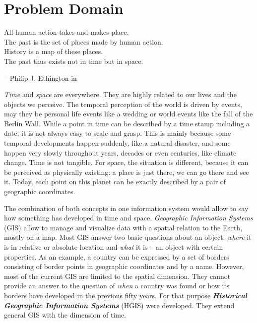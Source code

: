 
\newpage
\section{Problem Domain} %
\label{sec:problem_domain}

\begin{quoteit}
  All human action takes and makes place. \\
  The past is the set of places made by human action. \\
  History is a map of these places. \\
  The past thus exists not in time but in space.
\end{quoteit}
\hfill -- Philip J. Ethington in \cite[précis]{citeTakeMakePlace}

\emph{Time} and \emph{space} are everywhere. They are highly related to our lives and the objects we perceive. The temporal perception of the world is driven by events, may they be personal life events like a wedding or world events like the fall of the Berlin Wall. While a point in time can be described by a time stamp including a date, it is not always easy to scale and grasp. This is mainly because some temporal developments happen suddenly, like a natural disaster, and some happen very slowly throughout years, decades or even centuries, like climate change. Time is not tangible. For space, the situation is different, because it can be perceived as physically existing: a place is just there, we can go there and see it. Today, each point on this planet can be exactly described by a pair of geographic coordinates.

The combination of both concepts in one information system would allow to say how something has developed in time and space. \emph{Geographic Information Systems} (GIS) allow to manage and visualize data with a spatial relation to the Earth, mostly on a map. Most GIS answer two basic questions about an object: \emph{where} it is in relative or absolute location and \emph{what} it is -- an object with certain properties. As an example, a country can be expressed by a set of borders consisting of border points in geographic coordinates and by a name. However, most of the current GIS are limited to the spatial dimension. They cannot provide an answer to the question of \emph{when} a country was found or how its borders have developed in the previous fifty years. For that purpose \textbf{\emph{Historical Geographic Information Systems}} (HGIS) were developed. They extend general GIS with the dimension of time.

